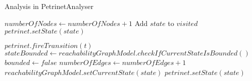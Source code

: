 \begin{algorithm}
\caption{Analysis in PetrinetAnalyser}
\label{algorithm:analyser}
\begin{algorithmic}


    	\State \Return
    \EndIf
        \State \Return
    \EndIf
    \State $numberOfNodes \gets numberOfNodes + 1$
    \State Add $state$ to $visited$
    \State $petrinet.setState(state)$

        \State $petrinet.fireTransition(t)$
        \State $stateBounded \gets reachabilityGraphModel.checkIfCurrentStateIsBounded()$
            \State $bounded \gets false$
            \State \Return
        \EndIf
        \State $numberOfEdges \gets numberOfEdges + 1$
        \State {}
        \State $reachabilityGraphModel.setCurrentState(state)$
        \State $petrinet.setState(state)$
    \EndFor
\EndFunction

\end{algorithmic}
\end{algorithm}

